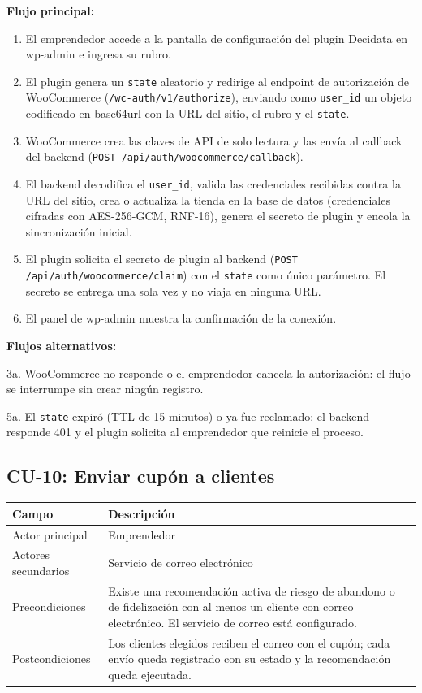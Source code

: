 \noindent\textbf{Flujo principal:}
\begin{enumerate}
    \item El emprendedor accede a la pantalla de configuración del plugin Decidata en wp-admin e ingresa su rubro.
    \item El plugin genera un \texttt{state} aleatorio y redirige al endpoint de autorización de WooCommerce (\texttt{/wc-auth/v1/authorize}), enviando como \texttt{user\_id} un objeto codificado en base64url con la URL del sitio, el rubro y el \texttt{state}.
    \item WooCommerce crea las claves de API de solo lectura y las envía al callback del backend (\texttt{POST /api/auth/woocommerce/callback}).
    \item El backend decodifica el \texttt{user\_id}, valida las credenciales recibidas contra la URL del sitio, crea o actualiza la tienda en la base de datos (credenciales cifradas con AES-256-GCM, RNF-16), genera el secreto de plugin y encola la sincronización inicial.
    \item El plugin solicita el secreto de plugin al backend (\texttt{POST /api/auth/woocommerce/claim}) con el \texttt{state} como único parámetro. El secreto se entrega una sola vez y no viaja en ninguna URL.
    \item El panel de wp-admin muestra la confirmación de la conexión.
\end{enumerate}

\noindent\textbf{Flujos alternativos:}

\noindent 3a. WooCommerce no responde o el emprendedor cancela la autorización: el flujo se interrumpe sin crear ningún registro.

\noindent 5a. El \texttt{state} expiró (TTL de 15 minutos) o ya fue reclamado: el backend responde 401 y el plugin solicita al emprendedor que reinicie el proceso.

\subsection{CU-10: Enviar cupón a clientes}
\label{sec:cu-10}

\begin{table}[h]
\centering
\renewcommand{\arraystretch}{1.3}
\begin{tabular}{|m{3cm}|m{11.3cm}|}
\hline
\textbf{Campo} & \textbf{Descripción} \\
\hline
Actor principal & Emprendedor \\
\hline
Actores secundarios & Servicio de correo electrónico \\
\hline
Precondiciones & Existe una recomendación activa de riesgo de abandono o de fidelización con al menos un cliente con correo electrónico. El servicio de correo está configurado. \\
\hline
Postcondiciones & Los clientes elegidos reciben el correo con el cupón; cada envío queda registrado con su estado y la recomendación queda ejecutada. \\
\hline
\end{tabular}
\end{table}

